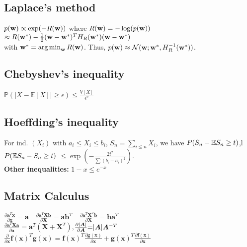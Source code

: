 \subsection*{Laplace's method}
$p({\mathbf{w}}) \propto \exp(-R({\mathbf{w}}))$ where $R({\mathbf{w}}) = -\log(p({\mathbf{w}}))$\\ $\approx R({\mathbf{w}}^*) - \frac{1}{2}({\mathbf{w}}-{\mathbf{w}}^*)^TH_R({\mathbf{w}}^*)({\mathbf{w}}-{\mathbf{w}}^*)$\\ with ${\mathbf{w}}^* = \operatorname*{arg\,min}_{\mathbf{w}} R({\mathbf{w}})$. Thus, $p({\mathbf{w}}) \approx \mathcal{N}({\mathbf{w}};{\mathbf{w}}^*, H_R^{-1}({\mathbf{w}}^*))$.

\subsection*{Chebyshev's inequality}
$\mathbb{P}(|X-\mathbb{E}[X]|\geq \epsilon)\leq \frac{\mathbb{V}[X]}{\epsilon^2}$\\

\subsection*{Hoeffding's inequality}
For ind. $(X_i)$ with $a_i\leq X_i\leq b_i$, $S_n=\sum_{i\leq n}X_i$, we have $P(S_n-\mathbb{E} S_n\geq t)$,l $P(\mathbb{E} S_n - S_n \geq t)$ $\leq \exp(-\frac{2t^2}{\sum(b_i-a_i)^2})$.\\

\textbf{Other inequalities:} $1-x \leq e^{-x}$\quad

\subsection*{Matrix Calculus}
$\frac{\partial \mathbf{a}^T\mathbf{x}}{\partial\mathbf{x}}{=}\mathbf{a} \quad \frac{\partial \mathbf{a}^T\mathbf{Xb}}{\partial\mathbf{X}}{=}\mathbf{ab}^T \quad \frac{\partial \mathbf{a}^T\mathbf{X}^T\mathbf{b}}{\partial\mathbf{X}}{=}\mathbf{ba}^T $\\
$\frac{\partial \mathbf{a}^T\mathbf{Xa}}{\partial\mathbf{a}}{=}\mathbf{a}^T(\mathbf{X}+\mathbf{X}^T)$,$\frac{\partial |{\bm{A}}|}{\partial {\bm{A}}}{=}|{\bm{A}}|{\bm{A}}^{-T}$\\
 $\frac{\partial}{\partial\mathbf{x}} \mathbf{f(x)}^T\mathbf{g(x)}{=}\mathbf{f(x)}^T\frac{\partial \mathbf{g(x)}}{\partial\mathbf{x}}+\mathbf{g(x)}^T\frac{\partial\mathbf{f(x)}}{\partial\mathbf{x}}$\\


